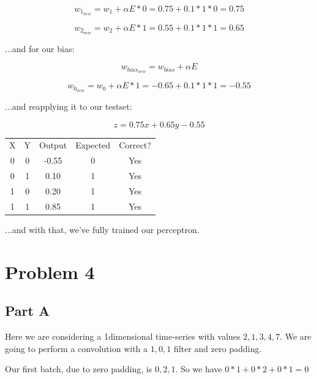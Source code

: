 \documentclass{article}
\begin{document}
\begin{equation}
    w_{1_{new}} = w_1 + \alpha E * 0 = 0.75 + 0.1*1*0 = 0.75
\end{equation}

\begin{equation}
    w_{2_{new}} = w_2 + \alpha E * 1 = 0.55 + 0.1*1*1 = 0.65
\end{equation}

\noindent ...and for our bias:

\begin{equation}
    w_{{bias}_{new}} = w_{bias} + \alpha E
\end{equation}

\begin{equation}
    w_{0_{new}} = w_0 + \alpha E * 1 = -0.65 + 0.1*1*1 = -0.55
\end{equation}

\noindent ...and reapplying it to our testset:

\begin{equation}
    z=0.75x+0.65y-0.55
\end{equation}

\begin{center}
    \begin{tabular}{c c c c c}
        X & Y & Output & Expected & Correct?\\
        0 & 0 & -0.55 & 0 & Yes\\
        0 & 1 & 0.10 & 1 & Yes\\
        1 & 0 & 0.20 & 1 & Yes\\
        1 & 1 & 0.85 & 1 & Yes\\
    \end{tabular}
\end{center}

\noindent ...and with that, we've fully trained our perceptron.

\section*{Problem 4}

\subsection*{Part A}

Here we are considering a 1dimensional time-series with values ${2, 1, 3, 4, 7}$. We are going to perform a convolution with a ${1, 0, 1}$ filter and zero padding.

\noindent Our first batch, due to zero padding, is ${0, 2, 1}$. So we have $0*1 + 0*2 + 0*1 = 0$
\end{document}

